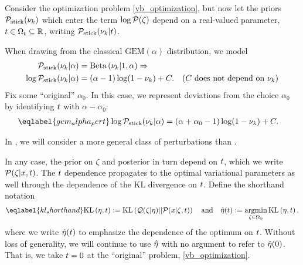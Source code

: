 Consider the optimization problem \eqref{vb_optimization}, but now let the
priors $\mathcal{P}_{\mathrm{stick}}(\nu_{k})$ which enter the term $\log \mathcal{P}(\zeta)$ depend on a
real-valued parameter, $t \in \Omega_{t} \subseteq \mathbb{R}$, writing
$\mathcal{P}_{\mathrm{stick}}(\nu_{k} \vert t)$.

\begin{ex}
%
When drawing from the classical $\mathrm{GEM}(\alpha)$ distribution, we
model
%
\begin{align*}
%
\pstick(\nuk \vert \alpha) ={}&
    \betadist{\nuk \vert 1, \alpha} \Rightarrow\\
\log \pstick(\nuk \vert \alpha) ={}&
    (\alpha - 1) \log(1 - \nuk) + \const. &
    \constdesc{\nuk}
%
\end{align*}
%
Fix some ``original'' $\alpha_0$.  In this case, we represent deviations from the
choice $\alpha_0$ by identifying $t$ with $\alpha - \alpha_0$:
%
\begin{align}\eqlabel{gem_alpha_pert}
%
\log \pstick(\nuk \vert \alpha) ={}&
    (\alpha + \alpha_0 - 1) \log(1 - \nuk) + \const.
%
\end{align}
%
\end{ex}

In , we will consider a more general class of
perturbations than .

In any case, the prior on $\zeta$ and posterior in turn depend on $t$, which we
write $\mathcal{P}(\zeta \vert x, t)$. The $t$ dependence propagates to the optimal
variational parameters as well through the dependence of the KL divergence on
$t$.  Define the shorthand notation
%
\begin{align}\eqlabel{kl_shorthand}
%
\KL{\eta, \t} := \KL{\q(\zeta \vert \eta) || \p(\x \vert \zeta, \t)}
\mathand
\etaopt(\t) := \argmin_{\zeta \in \etadom} \KL{\eta, \t},
%
\end{align}
%
where we write $\hat\eta(t)$ to emphasize the dependence of the optimum on $t$.
Without loss of generality, we will continue to use $\hat\eta$ with no argument
to refer to $\hat\eta(0)$.  That is, we take $t = 0$ at the ``original''
problem, \eqref{vb_optimization}.

